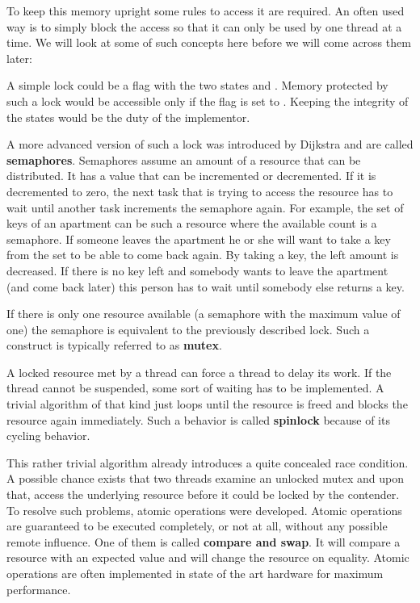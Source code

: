 To keep this memory upright some rules to access it are required. An often used way is to simply block the access so that it can only be used by one thread at a time. We will look at some of such concepts here before we will come across them later:
 
A simple lock could be a flag with the two states  and . Memory protected by such a lock would be accessible only if the flag is set to . Keeping the integrity of the states would be the duty of the implementor.

A more advanced version of such a lock was introduced by Dijkstra\cite{dijkstra1968cooperating} and are called \textbf{semaphores}. Semaphores assume an amount of a resource that can be distributed. It has a value that can be incremented or decremented. If it is decremented to zero, the next task that is trying to access the resource has to wait until another task increments the semaphore again. For example, the set of keys of an apartment can be such a resource where the available count is a semaphore. If someone leaves the apartment he or she will want to take a key from the set to be able to come back again. By taking a key, the left amount is decreased. If there is no key left and somebody wants to leave the apartment (and come back later) this person has to wait until somebody else returns a key.

If there is only one resource available (a semaphore with the maximum value of one) the semaphore is equivalent to the previously described lock. Such a construct is typically referred to as \textbf{mutex}.

A locked resource met by a thread can force a thread to delay its work. If the thread cannot be suspended, some sort of waiting has to be implemented. A trivial algorithm of that kind just loops until the resource is freed and blocks the resource again immediately. Such a behavior is called \textbf{spinlock} because of its cycling behavior.

This rather trivial algorithm already introduces a quite concealed race condition. A possible chance exists that two threads examine an unlocked mutex and upon that, access the underlying resource before it could be locked by the contender. To resolve such problems, atomic operations were developed. Atomic operations are guaranteed to be executed completely, or not at all, without any possible remote influence. One of them is called \textbf{compare and swap}. It will compare a resource with an expected value and will change the resource on equality. Atomic operations are often implemented in state of the art hardware for maximum performance.

